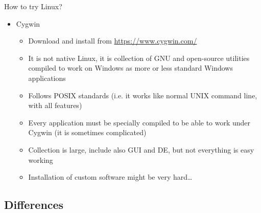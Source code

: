 \documentclass[compress, xelatex, 11pt, xcolor=svgnames, aspectratio=169,
	hyperref={
		bookmarks=true,
		unicode=true,
		colorlinks=true,
		pdftitle={Linux, command line and MetaCentrum},
		plainpages=false,
		pdfauthor={Vojtech Zeisek},
		pdfsubject={Course about use of Linux command line, writing shell scripts and using MetaCentrum of CESNET},
		pdfcreator={XeLaTeX},
		pdfkeywords={Linux, GNU, BASH, shell, command line, MetaCentrum},
		linkcolor=DarkRed, %
		anchorcolor=DarkBlue, %
		citecolor=Indigo, %
		filecolor=NavyBlue, %
		menucolor=DarkMagenta, %
		urlcolor=DarkBlue, %
		},
	url={hyphens, lowtilde} %
	]{beamer}
\begin{document}
\begin{frame}[allowframebreaks]{How to try Linux?}
\begin{itemize}
		\begin{itemize}
			\item To install follow \url{https://learn.microsoft.com/windows/wsl/about}
			\item Version 1 only for command-line applications (it has some problems with paths, text files,~\ldots)
			\item Version 2 works well for most of tasks and allows GUI (experimental)
		\end{itemize}
		\item Cygwin
		\begin{itemize}
			\item Download and install from \url{https://www.cygwin.com/}
			\item It is not native Linux, it is collection of GNU and open-source utilities compiled to work on Windows as more or less standard Windows applications
			\item Follows POSIX standards (i.e. it works like normal UNIX command line, with all features)
			\item Every application must be specially compiled to be able to work under Cygwin (it is sometimes complicated)
			\item Collection is large, include also GUI and DE, but not everything is easy working
			\item Installation of custom software might be very hard\ldots
		\end{itemize}
	\end{itemize}
\end{frame}

\subsection{Differences}
\end{document}
